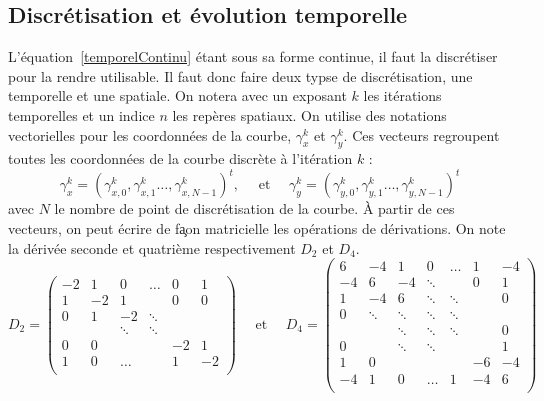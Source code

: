 \documentclass[10pt,a4paper]{article}
\begin{document}
\subsection{Discr\'{e}tisation et \'{e}volution temporelle}
L'\'{e}quation~\eqref{temporelContinu} \'{e}tant sous sa forme continue, il faut la discr\'{e}tiser pour la rendre utilisable. Il faut donc faire deux typse de discr\'{e}tisation, une temporelle et une spatiale. On notera avec un exposant $k$ les it\'{e}rations temporelles et un indice $n$ les rep\`{e}res spatiaux. On utilise des notations vectorielles pour les coordonn\'{e}es de la courbe, $\gamma_{x}^{k}$ et $\gamma_{y}^{k}$. Ces vecteurs regroupent toutes les coordonn\'{e}es de la courbe discr\`{e}te \`{a} l'it\'{e}ration $k$ : 
\begin{displaymath}
	\gamma_{x}^{k} = (\gamma_{x,0}^{k},\gamma_{x,1}^{k}\ldots,\gamma_{x,N-1}^{k})^{t}, \quad\text{    et    }\quad \gamma_{y}^{k} = (\gamma_{y,0}^{k},\gamma_{y,1}^{k}\ldots,\gamma_{y,N-1}^{k})^{t}
\end{displaymath}
avec $N$ le nombre de point de discr\'{e}tisation de la courbe. \`{A} partir de ces vecteurs, on peut \'{e}crire de fa\c{}on matricielle les op\'{e}rations de d\'{e}rivations. On note la d\'{e}riv\'{e}e seconde et quatri\`{e}me respectivement $D_2$ et $D_4$. 
\begin{displaymath}
	D_2 = \begin{pmatrix}
			 -2 & 1  & 0 & \ldots & 0 & 1\\
			 1  & -2 & 1 &             & 0 & 0 \\
			 0 & 1 & -2 &      \ddots        &   &  \\
			    &    &    \ddots  &      \ddots        &   &  \\
			0 & 0 &   &                & -2 & 1\\
			1 & 0 &  \ldots &  & 1 & -2\\
		 \end{pmatrix}
\quad\text{  et  }\quad
	D_4 = \begin{pmatrix}
			 6 & -4  & 1 & 0 &\ldots & 1 & -4\\
			 -4  & 6 & -4 & \ddots  &          & 0 & 1 \\
			 1 & -4 & 6 & \ddots   &   \ddots       &   & 0  \\
			  0  &  \ddots  &   \ddots   &  \ddots   &   \ddots      &   &  \\
			    &    &  \ddots    &  \ddots   &    \ddots     &   & 0 \\
			  0  &    &   \ddots   &  \ddots   &         &   & 1 \\
			1 & 0 &   &      &          & -6 & -4\\
			-4 & 1 &  0 & \ldots & 1 & -4 & 6\\
		 \end{pmatrix}
\end{displaymath}
\end{document}

